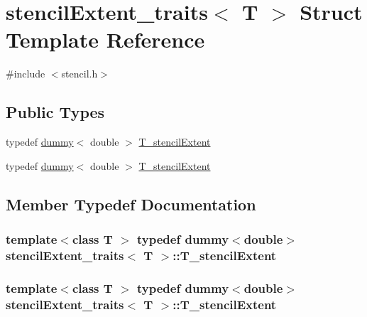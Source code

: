 \hypertarget{structstencilExtent__traits}{}\section{stencil\+Extent\+\_\+traits$<$ T $>$ Struct Template Reference}
\label{structstencilExtent__traits}


{\ttfamily \#include $<$stencil.\+h$>$}

\subsection*{Public Types}
\begin{DoxyCompactItemize}
\item 
typedef \hyperlink{classdummy}{dummy}$<$ double $>$ \hyperlink{structstencilExtent__traits_ad15bdb4aa27ac85161f4e7b093be0ca2}{T\+\_\+stencil\+Extent}
\item 
typedef \hyperlink{classdummy}{dummy}$<$ double $>$ \hyperlink{structstencilExtent__traits_ad15bdb4aa27ac85161f4e7b093be0ca2}{T\+\_\+stencil\+Extent}
\end{DoxyCompactItemize}


\subsection{Member Typedef Documentation}
\hypertarget{structstencilExtent__traits_ad15bdb4aa27ac85161f4e7b093be0ca2}{}
\subsubsection[{T\+\_\+stencil\+Extent}]{\setlength{\rightskip}{0pt plus 5cm}template$<$class T $>$ typedef {\bf dummy}$<$double$>$ {\bf stencil\+Extent\+\_\+traits}$<$ T $>$\+::{\bf T\+\_\+stencil\+Extent}}\label{structstencilExtent__traits_ad15bdb4aa27ac85161f4e7b093be0ca2}
\hypertarget{structstencilExtent__traits_ad15bdb4aa27ac85161f4e7b093be0ca2}{}
\subsubsection[{T\+\_\+stencil\+Extent}]{\setlength{\rightskip}{0pt plus 5cm}template$<$class T $>$ typedef {\bf dummy}$<$double$>$ {\bf stencil\+Extent\+\_\+traits}$<$ T $>$\+::{\bf T\+\_\+stencil\+Extent}}\label{structstencilExtent__traits_ad15bdb4aa27ac85161f4e7b093be0ca2}


